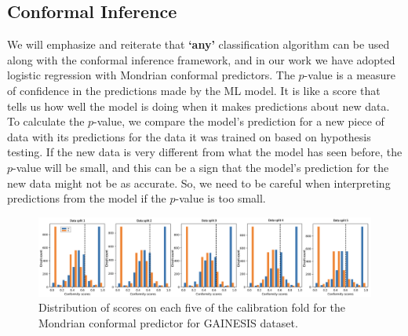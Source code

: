\subsection*{Conformal Inference}
\label{Sec:ConformalInference} 
We will emphasize and reiterate that \textbf{`any'} classification algorithm can be used along with the conformal inference framework, and in our work we have adopted logistic regression with Mondrian conformal predictors. The $p$-value is a measure of confidence in the predictions made by the ML model. It is like a score that tells us how well the model is doing when it makes predictions about new data. To calculate the $p$-value, we compare the model's prediction for a new piece of data with its predictions for the data it was trained on based on hypothesis testing. If the new data is very different from what the model has seen before, the $p$-value will be small, and this can be a sign that the model's prediction for the new data might not be as accurate. So, we need to be careful when interpreting predictions from the model if the $p$-value is too small.

\begin{figure}[ht]
\centering
  \includegraphics[width=\linewidth]{figs/split.png}
  \caption{Distribution of scores on each five of the calibration fold for the Mondrian conformal predictor for GAINESIS dataset.}
  \label{fig:b_fold}
\end{figure}

